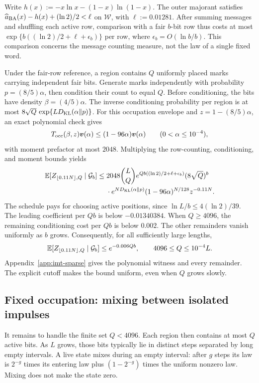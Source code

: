 Write $h(x):=-x\ln x-(1-x)\ln(1-x)$.
The outer majorant satisfies
$\widehat a_{\rm BA}(x)-h(x)+(\ln2)/2<\ell$ on $\mathcal W$,
with $\ell:=0.01281$.
After summing messages and shuffling each active row, comparison with
a fair $b$-bit row thus costs at most
$\exp\{b((\ln2)/2+\ell+\epsilon_b)\}$ per row,
where $\epsilon_b=O(\ln b/b)$.
This comparison concerns the message counting measure, not the law of a
single fixed word.

Under the fair-row reference, a region contains $Q$ uniformly placed
marks carrying independent fair bits. Generate marks independently with
probability $p=(8/5)\alpha$, then condition their count to equal $Q$.
Before conditioning, the bits have density $\beta=(4/5)\alpha$.
The inverse conditioning probability per region is at most
$8\sqrt Q\,\exp\{LD_{\rm KL}(\alpha\Vert p)\}$.
For this occupation envelope and $z=1-(8/5)\alpha$, an exact polynomial
check gives
\[
 T_{\rm occ}(\beta,z)\boldsymbol v(\alpha)
 \le(1-96\alpha)\boldsymbol v(\alpha)
 \qquad(0<\alpha\le10^{-4}),
\]
with moment prefactor at most $2048$.
Multiplying the row-counting, conditioning, and moment bounds yields
\[
 \begin{aligned}
 \mathbb E[Z_{\lfloor0.11N\rfloor,Q}\mid\mathcal G_b]
 \le{}&2048\binom LQ
 e^{Qb((\ln2)/2+\ell+\epsilon_b)}(8\sqrt Q)^b\\
 &{}\cdot e^{ND_{\rm KL}(\alpha\Vert p)}
 (1-96\alpha)^{N/128}z^{-0.11N}.
 \end{aligned}
\]
The schedule pays for choosing active positions, since
$\ln L/b\le4(\ln2)/39$. The leading coefficient per $Qb$ is below
$-0.01340384$. When $Q\ge4096$, the remaining conditioning cost per $Qb$
is below $0.002$.
The other remainders vanish uniformly as $b$ grows.
Consequently, for all sufficiently large lengths,
\[
 \mathbb E[Z_{\lfloor0.11N\rfloor,Q}\mid\mathcal G_b]
 \le e^{-0.006Qb},
 \qquad4096\le Q\le10^{-4}L.
\]
Appendix~\ref{app:imt-sparse} gives the polynomial witness and every remainder.
The explicit cutoff makes the bound uniform, even when $Q$ grows slowly.

\subsection{Fixed occupation: mixing between isolated impulses}

It remains to handle the finite set $Q<4096$.
Each region then contains at most $Q$ active bits.
As $L$ grows, those bits typically lie in distinct steps separated by
long empty intervals. A live state mixes during an empty interval:
after $g$ steps its law is
$2^{-g}$ times its entering law plus $(1-2^{-g})$ times the uniform
nonzero law. Mixing does not make the state zero.

